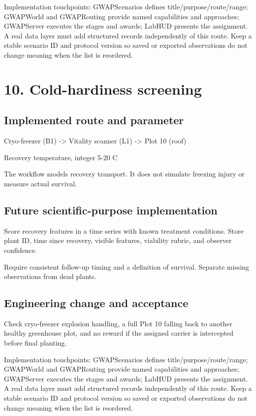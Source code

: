 Implementation touchpoints: GWAPScenarios defines title/\allowbreak{}purpose/\allowbreak{}route/\allowbreak{}range; GWAPWorld and GWAPRouting provide named capabilities and approaches; GWAPServer executes the stages and awards; LabHUD presents the assignment.\allowbreak{} A real data layer must add structured records independently of this route.\allowbreak{} Keep a stable scenario ID and protocol version so saved or exported observations do not change meaning when the list is reordered.\allowbreak{}

\section{10.\allowbreak{} Cold-hardiness screening}
\subsection{Implemented route and parameter}
Cryo-freezer (B1) -> Vitality scanner (L1) -> Plot 10 (roof)

Recovery temperature, integer 5-20 C

The workflow models recovery transport.\allowbreak{} It does not simulate freezing injury or measure actual survival.\allowbreak{}

\subsection{Future scientific-purpose implementation}
Score recovery features in a time series with known treatment conditions.\allowbreak{} Store plant ID, time since recovery, visible features, viability rubric, and observer confidence.\allowbreak{}

Require consistent follow-up timing and a definition of survival.\allowbreak{} Separate missing observations from dead plants.\allowbreak{}

\subsection{Engineering change and acceptance}
Check cryo-freezer explosion handling, a full Plot 10 falling back to another healthy greenhouse plot, and no reward if the assigned carrier is intercepted before final planting.\allowbreak{}

Implementation touchpoints: GWAPScenarios defines title/\allowbreak{}purpose/\allowbreak{}route/\allowbreak{}range; GWAPWorld and GWAPRouting provide named capabilities and approaches; GWAPServer executes the stages and awards; LabHUD presents the assignment.\allowbreak{} A real data layer must add structured records independently of this route.\allowbreak{} Keep a stable scenario ID and protocol version so saved or exported observations do not change meaning when the list is reordered.\allowbreak{}


